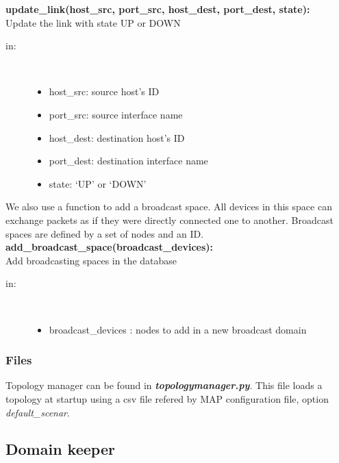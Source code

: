 \textbf{update\_link(host\_src, port\_src, host\_dest, port\_dest, state):}\\
Update the link with state UP or DOWN
\begin{description}
    \item[in:] \hfill \\
        \begin{itemize}
            \item host\_src: source host’s ID
            \item port\_src: source interface name
            \item host\_dest: destination host’s ID
            \item port\_dest: destination interface name
            \item state: ‘UP’ or ‘DOWN’
        \end{itemize}
\end{description}

We also use a function to add a broadcast space. All devices in this space can exchange packets as if they were directly connected one to another. Broadcast spaces are defined by a set of nodes and an ID.\\[1\baselineskip]
\textbf{add\_broadcast\_space(broadcast\_devices):}\\
Add broadcasting spaces in the database
\begin{description}
    \item[in:] \hfill \\
        \begin{itemize}
            \item broadcast\_devices : nodes to add in a new broadcast domain
        \end{itemize}
\end{description}

\subsubsection{Files}
Topology manager can be found in \emph{\textbf{topologymanager.py}}. This file loads a topology at startup using a csv file refered by MAP configuration file, option \emph{default\_scenar}.

\subsection{Domain keeper}

